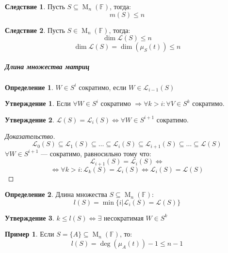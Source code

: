 \documentclass[a4paper, 14pt]{extarticle}
\theoremstyle{definition}
\newtheorem{definition}{Определение}
\newtheorem{conseq}{Следствие}
\newtheorem{example}{Пример}
\newtheorem{state}{Утверждение}
\begin{document}
\begin{conseq}
	Пусть \(S \subseteq \operatorname{M}_n(\mathbb{F})\), тогда:
	\[m(S) \leqslant n\]
\end{conseq}

\begin{conseq}
	Пусть \(S \in \operatorname{M}_n(\mathbb{F})\), тогда:
	\[\operatorname{dim} \mathcal{L}(S) \leqslant n\]
	\[\operatorname{dim} \mathcal{L}(S) = \operatorname{dim}(\mu_S(t)) \leqslant n\]
\end{conseq}

\subparagraph{Длина множества матриц}

\begin{definition}
	\(W \in S^{i}\) сократимо, если \(W \in \mathcal{L}_{i - 1}(S)\)
\end{definition}

\begin{state}
	Если \(\forall W \in S^i\) сократимо \(\Rightarrow \forall k > i: \forall V \in S^k\) сократимо.
\end{state}

\begin{state}
	\(\mathcal{L}(S) = \mathcal{L}_i(S) \Leftrightarrow \forall W \in S^{i + 1}\) сократимо.
\end{state}

\begin{proof}[Доказательство]
	\[\mathcal{L}_0(S) \subseteq \mathcal{L}_1(S) \subseteq \dots \subseteq \mathcal{L}_i(S) \subseteq \mathcal{L}_{i + 1}(S) \subseteq \dots \subseteq \mathcal{L}(S)\]
	\(\forall W \in S^{i + 1}\) --- сократимо, равносильно тому что:
	\[\mathcal{L}_{i + 1}(S) = \mathcal{L}_i(S) \Leftrightarrow\]
	\[\Leftrightarrow \forall k > i : \mathcal{L}_k(S) = \mathcal{L}_i(S) \Leftrightarrow \mathcal{L}_i(S) = \mathcal{L}(S)\]
\end{proof}

\begin{definition}
	Длина множества \(S \subseteq \operatorname{M}_n(\mathbb{F})\):
	\[l(S) = \operatorname{min}\{i | \mathcal{L}_i(S) = \mathcal{L}(S)\}\]
\end{definition}

\begin{state}
	\(k \leqslant l(S) \Leftrightarrow \exists\) несократимая \(W \in S^k\)
\end{state}

\begin{example}
	Если \(S = \{A\} \subseteq \operatorname{M}_n(\mathbb{F})\), то:
	\[l(S) = \operatorname{deg}(\mu_A(t)) - 1 \leqslant n - 1\]
\end{example}
\end{document}
